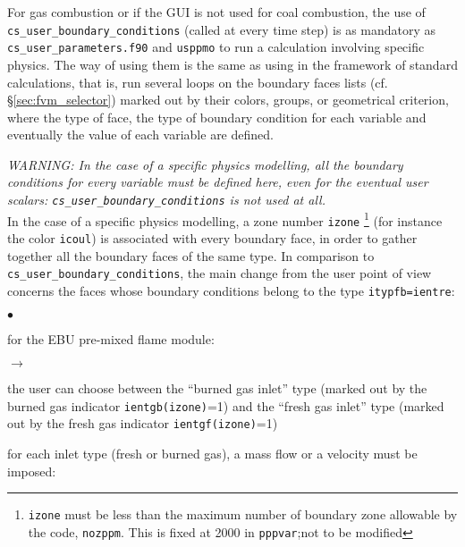 {{{For gas combustion or if the GUI is not used for coal combustion, the use of
\texttt{cs\_user\_boundary\_conditions} (called at every time step) is as
mandatory as \texttt{cs\_user\_parameters.f90} and \texttt{usppmo} to run a calculation involving specific physics. The way of using them is the same as using
 in the framework of standard calculations, that is, run several loops on the boundary faces lists (cf. \S\ref{sec:fvm_selector})
marked out by their colors, groups, or  geometrical criterion, where
the type of face, the type of boundary condition for each variable and
eventually the value of each variable are defined.

{\em WARNING: In the case of a specific physics modelling, all the
boundary conditions for every variable must be defined here, even for
the eventual user scalars: {\em \texttt{cs\_user\_boundary\_conditions}} is not used at all.}\\

In the case of a specific physics modelling, a zone number \texttt{izone}
\footnote{\texttt{izone} must be less than the maximum number of boundary
zone allowable by the code, \texttt{nozppm}. This is fixed at 2000 in
 \texttt{pppvar};not to be modified} (for
instance the color \texttt{icoul}) is associated with every boundary face, in
order to gather together all the boundary faces of the same type. In
comparison to \texttt{cs\_user\_boundary\_conditions}, the main change from the user point of
view concerns the faces whose boundary conditions belong to the type
\texttt{itypfb=ientre}:

\begin{list}{$\bullet$}{}
       \item for the EBU pre-mixed flame module:
             \begin{list}{$\rightarrow$}{}
                    \item the user can choose between the ``burned gas
                          inlet'' type (marked out by the burned gas indicator
                          \texttt{ientgb(izone)}=1) and the
                          ``fresh gas inlet'' type (marked out by
                          the fresh gas indicator
                          \texttt{ientgf(izone)}=1)
                    \item for each inlet type (fresh or burned
                          gas), a mass flow or a velocity must be imposed:


\end{list}
\end{list}}}}
